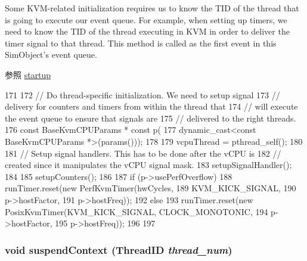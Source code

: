 Some KVM-\/related initialization requires us to know the TID of the thread that is going to execute our event queue. For example, when setting up timers, we need to know the TID of the thread executing in KVM in order to deliver the timer signal to that thread. This method is called as the first event in this SimObject's event queue.

\begin{DoxySeeAlso}{参照}
\hyperlink{classBaseKvmCPU_aecc7d8debf54990ffeaaed5bac7d7d81}{startup} 
\end{DoxySeeAlso}



\begin{DoxyCode}
171 {
172     // Do thread-specific initialization. We need to setup signal
173     // delivery for counters and timers from within the thread that
174     // will execute the event queue to ensure that signals are
175     // delivered to the right threads.
176     const BaseKvmCPUParams * const p(
177         dynamic_cast<const BaseKvmCPUParams *>(params()));
178 
179     vcpuThread = pthread_self();
180 
181     // Setup signal handlers. This has to be done after the vCPU is
182     // created since it manipulates the vCPU signal mask.
183     setupSignalHandler();
184 
185     setupCounters();
186 
187     if (p->usePerfOverflow)
188         runTimer.reset(new PerfKvmTimer(hwCycles,
189                                         KVM_KICK_SIGNAL,
190                                         p->hostFactor,
191                                         p->hostFreq));
192     else
193         runTimer.reset(new PosixKvmTimer(KVM_KICK_SIGNAL, CLOCK_MONOTONIC,
194                                          p->hostFactor,
195                                          p->hostFreq));
196 
197 }
\end{DoxyCode}
\hypertarget{classBaseKvmCPU_a1dad4c4d2c3df4ef367e14fcc973ce74}{
\subsubsection[{suspendContext}]{\setlength{\rightskip}{0pt plus 5cm}void suspendContext ({\bf ThreadID} {\em thread\_\-num})}}
\label{classBaseKvmCPU_a1dad4c4d2c3df4ef367e14fcc973ce74}



